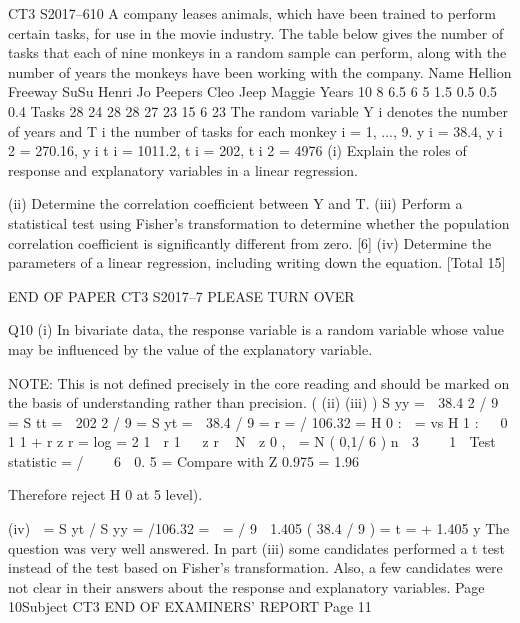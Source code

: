 \documentclass[a4paper,12pt]{article}
\begin{document}
CT3 S2017–610
A company leases animals, which have been trained to perform certain tasks, for
use in the movie industry. The table below gives the number of tasks that each of
nine monkeys in a random sample can perform, along with the number of years the
monkeys have been working with the company.
Name Hellion Freeway SuSu Henri Jo Peepers Cleo Jeep Maggie
Years 10 8 6.5 6 5 1.5 0.5 0.5 0.4
Tasks 28 24 28 28 27 23 15 6 23
The random variable Y i denotes the number of years and T i the number of tasks for
each monkey i = 1, ..., 9.
\sum y i = 38.4, \sum y i 2 = 270.16, \sum y i t i = 1011.2, \sum t i = 202, \sum t i 2 = 4976
(i)
Explain the roles of response and explanatory variables in a linear regression.

(ii) Determine the correlation coefficient between Y and T.
(iii) Perform a statistical test using Fisher’s transformation to determine whether
the population correlation coefficient is significantly different from zero. [6]
(iv) Determine the parameters of a linear regression, including writing down the
equation.
[Total 15]

END OF PAPER
CT3 S2017–7
PLEASE TURN OVER


Q10
(i)
In bivariate data, the response variable is a random variable whose value may
be influenced by the value of the explanatory variable.

NOTE: This is not defined precisely in the core reading and should be marked
on the basis of understanding rather than precision.
(
(ii)
(iii)
)
S yy \;=  38.4 2 / 9 \;= 
S tt \;=  202 2 / 9 \;= 
S yt \;=  38.4  / 9 \;= 
r \;= / 106.32  \;= 
H 0 :  \;= vs H 1 :   0 
1
1 + r
z r \;=\; log
\;=
2
1  r 
1 

z r ~ N  z 0 ,
 \;=\; N ( 0,1/ 6 )
n  3 
 
 1 
Test statistic \;= /  
 6 
0. 5
\;=
Compare with Z 0.975 = 1.96


Therefore reject H 0 at 5%
level).

(iv)
 \;=\; S yt / S yy \;= /106.32 \;= 
 \;= / 9  1.405 \times ( 38.4 / 9 ) \;= 
t \;= + 1.405 y 
The question was very well answered. In part (iii) some candidates
performed a t test instead of the test based on Fisher’s transformation.
Also, a few candidates were not clear in their answers about the
response and explanatory variables.
Page 10Subject CT3 %
END OF EXAMINERS’ REPORT
Page 11
\end{document}
